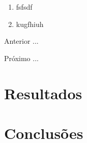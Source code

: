 \begin{enumerate}[label=\Roman{*}, ref=(\roman{*})]
  \item fsfsdf
  \item kugfhiuh
\end{enumerate}

\begin{asparaenum}
\item Anterior ... \cite{ninguem2022curioso}
\item Próximo ... \label{pl1}
\end{asparaenum}


\section{Resultados}







\section{Conclusões}




